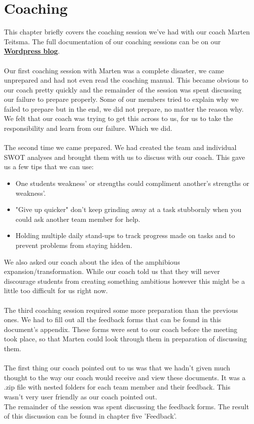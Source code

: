 \documentclass[12pt]{article}
\begin{document}
	\section{Coaching}
	This chapter briefly covers the coaching session we've had with our coach Marten Teitsma. The full documentation of our coaching sessions can be on our \href{https://metabotsrow.wordpress.com/}{\textbf{Wordpress blog}}.\\
	\\Our first coaching session with Marten was a complete disaster, we came unprepared and had not even read the coaching manual. This became obvious to our coach pretty quickly and the remainder of the session was spent discussing our failure to prepare properly. Some of our members tried to explain why we failed to prepare but in the end, we did not prepare, no matter the reason why. We felt that our coach was trying to get this across to us, for us to take the responsibility and learn from our failure. Which we did.\\
	\\The second time we came prepared. We had created the team and individual SWOT analyses and brought them with us to discuss with our coach. This gave us a few tips that we can use:
	\begin{itemize}
		\item One students weakness' or strengths could compliment another's strengths or weakness'.
		\item "Give up quicker" don't keep grinding away at a task stubbornly when you could ask another team member for help.
		\item Holding multiple daily stand-ups to track progress made on tasks and to prevent problems from staying hidden. 
	\end{itemize}
	We also asked our coach about the idea of the amphibious expansion/transformation. While our coach told us that they will never discourage students from creating something ambitious however this might be a little too difficult for us right now.\\
	\\The third coaching session required some more preparation than the previous ones. We had to fill out all the feedback forms that can be found in this document's appendix. These forms were sent to our coach before the meeting took place, so that Marten could look through them in preparation of discussing them.\\
	\\The first thing our coach pointed out to us was that we hadn't given much thought to the way our coach would receive and view these documents. It was a .zip file with nested folders for each team member and their feedback. This wasn't very user friendly as our coach pointed out.\\
	The remainder of the session was spent discussing the feedback forms. The result of this discussion can be found in chapter five 'Feedback'.
\end{document}

